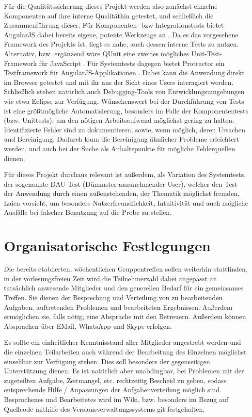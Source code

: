 Für die Qualitätssicherung dieses Projekt werden also zunächst einzelne Komponenten auf ihre \glqq interne Qualität\grqq hin getestet, und schließlich die Zusammenführung dieser. Für Komponenten- bzw Integrationstests bietet AngularJS dabei bereits eigene, potente Werkzeuge an \cite{[1]}. Da es das vorgesehene Framework des Projekts ist, liegt es nahe, auch dessen interne Tests zu nutzen. Alternativ, bzw. ergänzend wäre QUnit eine zweites mögliches Unit-Test-Framework für JavaScript \cite{[2]}. Für Systemtests dagegen bietet Protractor ein Testframework für AngularJS-Applikationen \cite{[3]}. Dabei kann die Anwendung direkt im Browser getestet und mit ihr aus der Sicht eines Users interagiert werden. Schließlich stehen natürlich auch Debugging-Tools von Entwicklungsumgebungen wie etwa Eclipse zur Verfügung. 
Wünschenswert bei der Durchführung von Tests ist eine größtmögliche Automatisierung, besonders im Falle der Komponententests (bzw. Unittests), um den nötigen Arbeitsaufwand möglichst gering zu halten. Identifizierte Fehler sind zu dokumentieren, sowie, wenn möglich, deren Ursachen und Bereinigung. Dadurch kann die Bereinigung ähnlicher Probleme erleichtert werden, und auch bei der Suche als Anhaltspunkte für mögliche Fehlerquellen dienen.

Für dieses Projekt durchaus relevant ist außerdem, als Variation des Systemtests, der sogenannte DAU-Test (Dümmster anzunehmender User), welcher den Test der Anwendung durch einen außenstehenden, der Thematik möglichst fremden, Laien vorsieht, um besonders Nutzerfreundlichkeit, Intuitivität und auch mögliche Ausfälle bei falscher Benutzung auf die Probe zu stellen.

\section{Organisatorische Festlegungen}

Die bereits etablierten, wöchentlichen Gruppentreffen sollen weiterhin stattfinden, in der vorlesungsfreien Zeit wird die Teilnehmerzahl dabei angepasst an tatsächlich anwesende Mitglieder und den generellen Bedarf für ein gemeinsames Treffen. Sie dienen der Besprechung und Verteilung von zu bearbeitenden Aufgaben, auftretenden Problemen und bearbeiteten Ergebnissen. Außerdem ermöglichen sie, falls nötig, eine Absprache mit den Betreuern. Außerdem können Absprachen über EMail, WhatsApp und Skype erfolgen.

Es sollte ein einheitlicher Kenntnisstand aller Mitglieder angestrebt werden und die einzelnen Teilarbeiten auch während der Bearbeitung des Einzelnen möglichst einsehbar zur Verfügung stehen. Dies soll besonders der gegenseitigen Unterstützung dienen. Es ist natürlich aber unabdingbar, bei Problemen mit der zugeteilten Aufgabe, Zeitmangel, etc. rechtzeitig Bescheid zu geben, sodass entsprechende Hilfe / Anpassungen der Aufgabenverteilung möglich sind.
Besprochenes und Bearbeitetes wird im Wiki, bzw. besonders im Bezug auf Quellcode mithilfe des Versionsverwaltungssystems git festgehalten.


